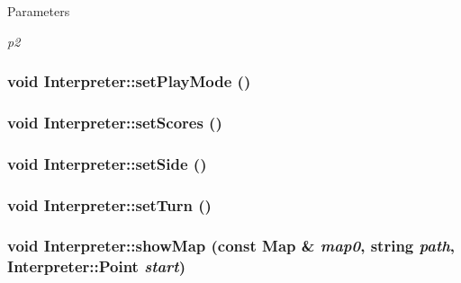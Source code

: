 \begin{DoxyParams}{Parameters}
\item[{\em p2}]\end{DoxyParams}
\hypertarget{classInterpreter_aef305fb79ee56df26f7fa4d2fb1be84e}{
\subsubsection[{setPlayMode}]{\setlength{\rightskip}{0pt plus 5cm}void Interpreter::setPlayMode ()}}
\label{classInterpreter_aef305fb79ee56df26f7fa4d2fb1be84e}
\hypertarget{classInterpreter_ad947f5a13997ba025515d65be4ca13a3}{
\subsubsection[{setScores}]{\setlength{\rightskip}{0pt plus 5cm}void Interpreter::setScores ()}}
\label{classInterpreter_ad947f5a13997ba025515d65be4ca13a3}
\hypertarget{classInterpreter_a7bcbe98cfcb820392776af34325af2f4}{
\subsubsection[{setSide}]{\setlength{\rightskip}{0pt plus 5cm}void Interpreter::setSide ()}}
\label{classInterpreter_a7bcbe98cfcb820392776af34325af2f4}
\hypertarget{classInterpreter_a976750d75dbde52f1de42b189bc3db0d}{
\subsubsection[{setTurn}]{\setlength{\rightskip}{0pt plus 5cm}void Interpreter::setTurn ()}}
\label{classInterpreter_a976750d75dbde52f1de42b189bc3db0d}
\hypertarget{classInterpreter_a28fca7f91931cc48a0dc91cbbb08ba7a}{
\subsubsection[{showMap}]{\setlength{\rightskip}{0pt plus 5cm}void Interpreter::showMap (const {\bf Map} \& {\em map0}, \/  string {\em path}, \/  {\bf Interpreter::Point} {\em start})}}
\label{classInterpreter_a28fca7f91931cc48a0dc91cbbb08ba7a}

